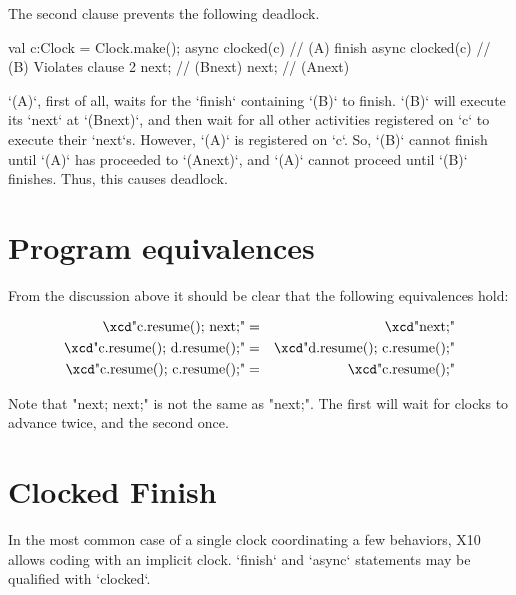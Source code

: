 The second clause prevents the following deadlock.  
\begin{xten}
val c:Clock = Clock.make();
async clocked(c) {                // (A) 
      finish async clocked(c) {   // (B) Violates clause 2
            next;                 // (Bnext)
      }
      next;                       // (Anext)
}
\end{xten}
\xcd`(A)`, first of all, waits for the \xcd`finish` containing \xcd`(B)` to
finish.  
\xcd`(B)` will execute its \xcd`next` at \xcd`(Bnext)`, and then wait for all
other activities registered on \xcd`c` to execute their \xcd`next`s.
However, \xcd`(A)` is registered on \xcd`c`.  So, \xcd`(B)` cannot finish
until \xcd`(A)` has proceeded to \xcd`(Anext)`, and \xcd`(A)` cannot proceed
until \xcd`(B)` finishes. Thus, this causes deadlock.


\section{Program equivalences}
From the discussion above it should be clear that the following
equivalences hold:

\begin{eqnarray}
 \mbox{\xcd"c.resume(); next;"}       &=& \mbox{\xcd"next;"}\\
 \mbox{\xcd"c.resume(); d.resume();"} &=& \mbox{\xcd"d.resume(); c.resume();"}\\
 \mbox{\xcd"c.resume(); c.resume();"} &=& \mbox{\xcd"c.resume();"}
\end{eqnarray}

Note that \xcd"next; next;" is not the same as \xcd"next;". The
first will wait for clocks to advance twice, and the second
once.  


\section{Clocked Finish}
\label{ClockedFinish}

In the most common case of a single clock coordinating a few behaviors, X10
allows coding with an implicit clock.  \xcd`finish` and \xcd`async` statements
may be qualified with \xcd`clocked`.  

